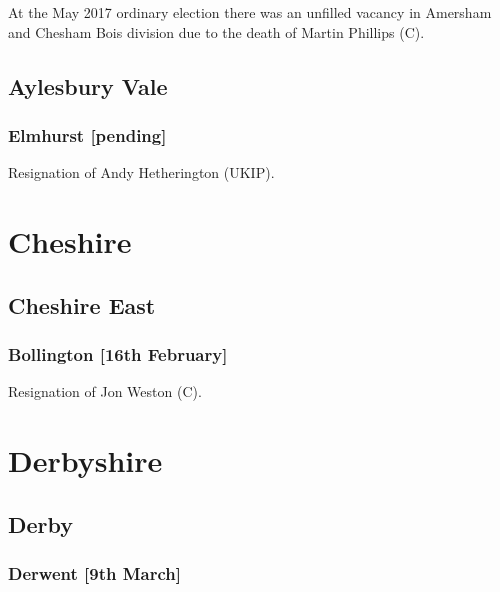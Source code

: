 \documentclass[a4paper,openany]{book}
\begin{document}
\begin{resultsiii}
At the May 2017 ordinary election there was an unfilled vacancy in Amersham and Chesham Bois division due to the death of Martin Phillips (C).

\subsection*{Aylesbury Vale}

\subsubsection*{Elmhurst \hspace*{\fill}\nolinebreak[1]%
\enspace\hspace*{\fill}
[pending]}


Resignation of Andy Hetherington (UKIP).

\section{Cheshire}

\subsection*{Cheshire East}

\subsubsection*{Bollington \hspace*{\fill}\nolinebreak[1]%
\enspace\hspace*{\fill}
[16th February]}


Resignation of Jon Weston (C).

\section{Derbyshire}

\subsection*{Derby}

\subsubsection*{Derwent \hspace*{\fill}\nolinebreak[1]%
\enspace\hspace*{\fill}
[9th March]}


\end{resultsiii}
\end{document}
